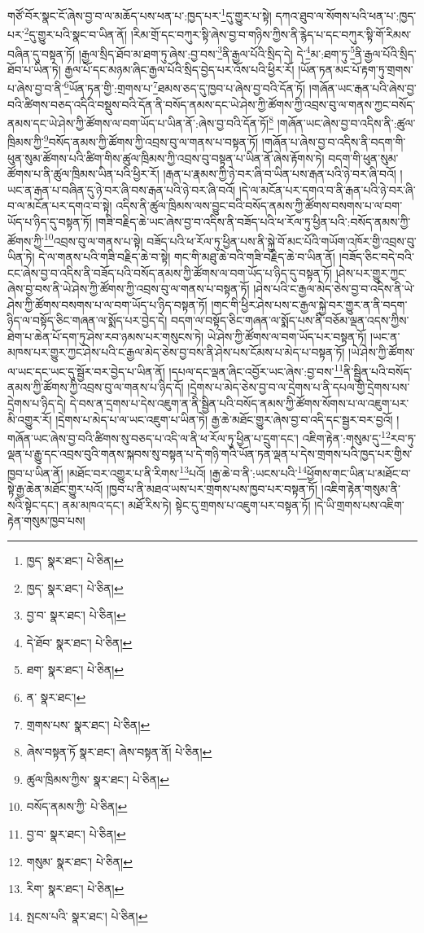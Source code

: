 གཙོ་བོར་སྣང་ངོ་ཞེས་བྱ་བ་ལ་མཆོད་པས་ཕན་པ་:ཁྱད་པར་\footnote{ཁྱད་  སྣར་ཐང་།  པེ་ཅིན། }དུ་གྱུར་པ་སྟེ། དཀའ་ཐུབ་ལ་སོགས་པའི་ཕན་པ་:ཁྱད་པར་\footnote{ཁྱད་  སྣར་ཐང་།  པེ་ཅིན། }དུ་གྱུར་པའི་སྣང་བ་ཡིན་ནོ། །རིམ་གྲོ་དང་བཀུར་སྟི་ཞེས་བྱ་བ་གཉིས་ཀྱིས་ནི་རྙེད་པ་དང་བཀུར་སྟི་གོ་རིམས་བཞིན་དུ་བསྟན་ཏོ། །རྒྱལ་སྲིད་ཐོབ་མ་ཐག་ཏུ་ཞེས་:བྱ་བས་\footnote{བྱ་བ་  སྣར་ཐང་།  པེ་ཅིན། }ནི་རྒྱལ་པོའི་སྲིད་དེ། དེ་\footnote{དེ་ཐོབ་  སྣར་ཐང་།  པེ་ཅིན། }མ་:ཐག་ཏུ་\footnote{ཐག་  སྣར་ཐང་།  པེ་ཅིན། }ནི་རྒྱལ་པོའི་སྲིད་ཐོབ་པ་ཡིན་ཏེ། རྒྱལ་པོ་དང་མཉམ་ཞིང་རྒྱལ་པོའི་སྲིད་བྱེད་པར་འོས་པའི་ཕྱིར་རོ། །ཡོན་ཏན་མང་པོ་རྟག་ཏུ་གྲགས་པ་ཞེས་བྱ་བ་ནི་\footnote{ན་  སྣར་ཐང་། }ཡོན་ཏན་གྱི་:གྲགས་པ་\footnote{གྲགས་པས་  སྣར་ཐང་།  པེ་ཅིན། }ཐམས་ཅད་དུ་ཁྱབ་པ་ཞེས་བྱ་བའི་དོན་ཏོ། །གཞོན་ཡང་རྒན་པའི་ཞེས་བྱ་བའི་ཚིགས་བཅད་འདིའི་བསྡུས་བའི་དོན་ནི་བསོད་ནམས་དང་ཡེ་ཤེས་ཀྱི་ཚོགས་ཀྱི་འབྲས་བུ་ལ་གནས་ཀྱང་བསོད་ནམས་དང་ཡེ་ཤེས་ཀྱི་ཚོགས་ལ་བག་ཡོད་པ་ཡིན་ནོ་:ཞེས་བྱ་བའི་དོན་ཏོ།\footnote{ཞེས་བསྟན་ཏོ  སྣར་ཐང་། ཞེས་བསྟན་ནོ།  པེ་ཅིན། } །གཞོན་ཡང་ཞེས་བྱ་བ་འདིས་ནི་:ཚུལ་ཁྲིམས་ཀྱི་\footnote{ཚུལ་ཁྲིམས་ཀྱིས་  སྣར་ཐང་།  པེ་ཅིན། }བསོད་ནམས་ཀྱི་ཚོགས་ཀྱི་འབྲས་བུ་ལ་གནས་པ་བསྟན་ཏོ། །གཞོན་པ་ཞེས་བྱ་བ་འདིས་ནི་བདག་གི་ཕུན་སུམ་ཚོགས་པའི་ཚིག་གིས་ཚུལ་ཁྲིམས་ཀྱི་འབྲས་བུ་བསྟན་པ་ཡིན་ནོ་ཞེས་རྟོགས་ཏེ། བདག་གི་ཕུན་སུམ་ཚོགས་པ་ནི་ཚུལ་ཁྲིམས་ཡིན་པའི་ཕྱིར་རོ། །རྒན་པ་རྣམས་ཀྱི་ཉེ་བར་ཞི་བ་ཡིན་པས་རྒན་པའི་ཉེ་བར་ཞི་བའོ། །ཡང་ན་རྒན་པ་བཞིན་དུ་ཉེ་བར་ཞི་བས་རྒན་པའི་ཉེ་བར་ཞི་བའོ། །དེ་ལ་མངོན་པར་དགའ་བ་ནི་རྒན་པའི་ཉེ་བར་ཞི་བ་ལ་མངོན་པར་དགའ་བ་སྟེ། འདིས་ནི་ཚུལ་ཁྲིམས་ལས་བྱུང་བའི་བསོད་ནམས་ཀྱི་ཚོགས་བསགས་པ་ལ་བག་ཡོད་པ་ཉིད་དུ་བསྟན་ཏོ། །གཟི་བརྗིད་ཆེ་ཡང་ཞེས་བྱ་བ་འདིས་ནི་བཟོད་པའི་ཕ་རོལ་ཏུ་ཕྱིན་པའི་:བསོད་ནམས་ཀྱི་ཚོགས་ཀྱི་\footnote{བསོད་ནམས་ཀྱི་  པེ་ཅིན། }འབྲས་བུ་ལ་གནས་པ་སྟེ། བཟོད་པའི་ཕ་རོལ་ཏུ་ཕྱིན་པས་ནི་སྐྱེ་བོ་མང་པོའི་གཡོག་འཁོར་གྱི་འབྲས་བུ་ཡིན་ཏེ། དེ་ལ་གནས་པའི་གཟི་བརྗིད་ཆེ་བ་སྟེ། གང་གི་མཐུ་ཆེ་བའི་གཟི་བརྗིད་ཆེ་བ་ཡིན་ནོ། །བཟོད་ཅིང་བདེ་བའི་ངང་ཞེས་བྱ་བ་འདིས་ནི་བཟོད་པའི་བསོད་ནམས་ཀྱི་ཚོགས་ལ་བག་ཡོད་པ་ཉིད་དུ་བསྟན་ཏོ། །ཤེས་པར་གྱུར་ཀྱང་ཞེས་བྱ་བས་ནི་ཡེ་ཤེས་ཀྱི་ཚོགས་ཀྱི་འབྲས་བུ་ལ་གནས་པ་བསྟན་ཏོ། །ཤེས་པའི་ང་རྒྱལ་མེད་ཅེས་བྱ་བ་འདིས་ནི་ཡེ་ཤེས་ཀྱི་ཚོགས་བསགས་པ་ལ་བག་ཡོད་པ་ཉིད་བསྟན་ཏོ། །གང་གི་ཕྱིར་ཤེས་པས་ང་རྒྱལ་སྐྱེ་བར་གྱུར་ན་ནི་བདག་ཉིད་ལ་བསྟོད་ཅིང་གཞན་ལ་སྨོད་པར་བྱེད་དེ། བདག་ལ་བསྟོད་ཅིང་གཞན་ལ་སྨོད་པས་ནི་བཅོམ་ལྡན་འདས་ཀྱིས་ཐེག་པ་ཆེན་པོ་དག་ཏུ་ཤེས་རབ་ཉམས་པར་གསུངས་ཏེ། ཡེ་ཤེས་ཀྱི་ཚོགས་ལ་བག་ཡོད་པར་བསྟན་ཏོ། །ཡང་ན་མཁས་པར་གྱུར་ཀྱང་ཤེས་པའི་ང་རྒྱལ་མེད་ཅེས་བྱ་བས་ནི་ཤེས་པས་ངོམས་པ་མེད་པ་བསྟན་ཏོ། །ཡེ་ཤེས་ཀྱི་ཚོགས་ལ་ཡང་དང་ཡང་དུ་སྦྱོར་བར་བྱེད་པ་ཡིན་ནོ། །དཔལ་དང་ལྡན་ཞིང་འབྱོར་ཡང་ཞེས་:བྱ་བས་\footnote{བྱ་བ་  སྣར་ཐང་།  པེ་ཅིན། }ནི་སྦྱིན་པའི་བསོད་ནམས་ཀྱི་ཚོགས་ཀྱི་འབྲས་བུ་ལ་གནས་པ་ཉིད་དོ། །དྲེགས་པ་མེད་ཅེས་བྱ་བ་ལ་དྲེགས་པ་ནི་དཔལ་གྱི་དྲེགས་པས་དྲེགས་པ་ཉིད་དེ། དེ་བས་ན་དྲགས་པ་དེས་འཇུག་ན་ནི་སྦྱིན་པའི་བསོད་ནམས་ཀྱི་ཚོགས་སོགས་པ་ལ་འཇུག་པར་མི་འགྱུར་རོ། །དྲེགས་པ་མེད་པ་ལ་ཡང་འཇུག་པ་ཡིན་ཏེ། རྒྱ་ཆེ་མཐོང་གྱུར་ཞེས་བྱ་བ་འདི་དང་སྦྱར་བར་བྱའོ། །གཞོན་ཡང་ཞེས་བྱ་བའི་ཚིགས་སུ་བཅད་པ་འདི་ལ་ནི་ཕ་རོལ་ཏུ་ཕྱིན་པ་དྲུག་དང་། འཇིག་རྟེན་:གསུམ་དུ་\footnote{གསུམ་  སྣར་ཐང་།  པེ་ཅིན། }རབ་ཏུ་ལྡན་པ་རྒྱུ་དང་འབྲས་བུའི་གནས་སྐབས་སུ་བསྟན་པ་དེ་གཉི་གའི་ཡོན་ཏན་ལྡན་པ་དེས་གྲགས་པའི་ཁྱད་པར་གྱིས་ཁྱབ་པ་ཡིན་ནོ། །མཐོང་བར་འགྱུར་པ་ནི་རིགས་\footnote{རིག་  སྣར་ཐང་།  པེ་ཅིན། }པའོ། །རྒྱ་ཆེ་བ་ནི་:ཡངས་པའི་\footnote{སྤངས་པའི་  སྣར་ཐང་།  པེ་ཅིན། }ཕྱོགས་གང་ཡིན་པ་མཐོང་བ་སྟེ་རྒྱ་ཆེན་མཐོང་གྱུར་པའོ། །ཁྱབ་པ་ནི་མཐའ་ཡས་པར་གྲགས་པས་ཁྱབ་པར་བསྟན་ཏོ། །འཇིག་རྟེན་གསུམ་ནི་སའི་སྟེང་དང་། ནམ་མཁའ་དང་། མཐོ་རིས་ཏེ། སྟེང་དུ་གྲགས་པ་འཇུག་པར་བསྟན་ཏོ། །དེ་ཡི་གྲགས་པས་འཇིག་རྟེན་གསུམ་ཁྱབ་པས། 